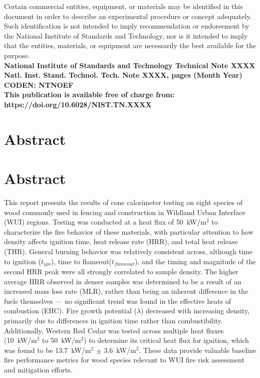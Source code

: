 \documentclass[12pt]{article}
\newcommand{\pubnumber}{XXXX}
\newcommand{\DOI}{https://doi.org/10.6028/NIST.TN.XXXX}
\newcommand{\monthyear}{Month Year}
\begin{document}
\begin{titlepage}
\begin{flushright}
\footnotesize  Certain commercial entities, equipment, or materials may be identified in this document in order to describe an experimental procedure or concept adequately. Such identification is not intended to imply recommendation or endorsement by the National Institute of Standards and Technology, nor is it intended to imply that the entities, materials, or equipment are necessarily the best available for the purpose.\\ 
\vfill
\normalsize \textbf{National Institute of Standards and Technology Technical Note \pubnumber\\ 
Natl. Inst. Stand. Technol. Tech. Note \pubnumber, \pageref{LastPage} pages (\monthyear)} \\
\textbf{CODEN: NTNOEF}\\
\vspace{12pt}
\textbf{This publication is available free of charge from: \DOI}
\vfill
\end{flushright}
\end{titlepage}


\section*{Abstract}
\section*{Abstract}
This report presents the results of cone calorimeter testing on eight species of wood commonly used in fencing and construction in Wildland Urban Interface (WUI) regions. Testing was conducted at a heat flux of 50~kW/m$^2$ to characterize the fire behavior of these materials, with particular attention to how density affects ignition time, heat release rate (HRR), and total heat release (THR). General burning behavior was relatively consistent across, although time to ignition ($t_{ign}$), time to flameout($t_{flameout}$), and the timing and magnitude of the second HRR peak were all strongly correlated to sample density. The higher average HRR observed in denser samples was determined to be a result of an increased mass loss rate (MLR), rather than being an inherent difference in the fuels themselves — no significant trend was found in the effective heats of combustion (EHC). Fire growth potential ($\lambda$) decreased with increasing density, primarily due to differences in ignition time rather than combustibility. Additionally, Western Red Cedar was tested across multiple heat fluxes (10~kW/m$^2$ to 50~kW/m$^2$) to determine its critical heat flux for ignition, which was found to be 13.7~kW/m$^2$ $\pm$ 3.6~kW/m$^2$. These data provide valuable baseline fire performance metrics for wood species relevant to WUI fire risk assessment and mitigation efforts.
\end{document}
